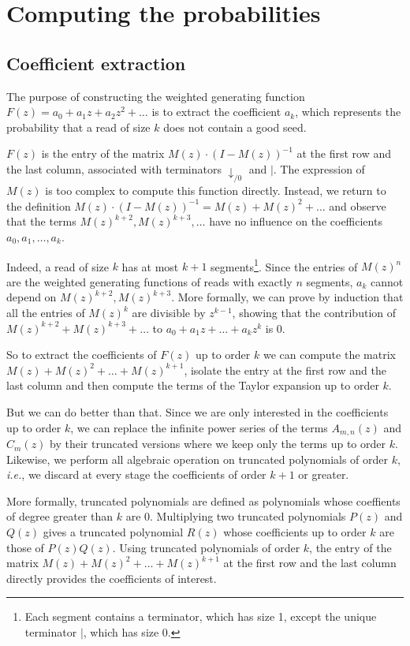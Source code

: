 \documentclass{article}
\begin{document}
\section{Computing the probabilities}
\label{sec:compute}

\subsection{Coefficient extraction}
\label{sec:extract}

The purpose of constructing the weighted generating function $F(z) = a_0 +
a_1z + a_2z^2 + \ldots$ is to extract the coefficient $a_k$, which
represents the probability that a read of size $k$ does not contain a
good seed.

$F(z)$ is the entry of the matrix $M(z) \cdot (I-M(z))^{-1}$ at the first
row and the last column, associated with terminators $\downarrow_{/0}$ and
$|$. The expression of $M(z)$ is too complex to compute this function
directly. Instead, we return to the definition $M(z) \cdot (I-M(z))^{-1} =
M(z) + M(z)^2 + \ldots$ and observe that the terms $M(z)^{k+2},
M(z)^{k+3}, \ldots$ have no influence on the coefficients $a_0, a_1,
\ldots, a_k$.

Indeed, a read of size $k$ has at most $k+1$ segments\footnote{Each
segment contains a terminator, which has size 1, except the unique
terminator $|$, which has size 0.}. Since the entries of $M(z)^n$ are the
weighted generating functions of reads with exactly $n$ segments, $a_k$
cannot depend on $M(z)^{k+2}, M(z)^{k+3}$. More formally, we can prove by
induction that all the entries of $M(z)^k$ are divisible by $z^{k-1}$,
showing that the contribution of $M(z)^{k+2} + M(z)^{k+3} + \ldots$ to
$a_0 + a_1z + \ldots +a_kz^k$ is $0$.

So to extract the coefficients of $F(z)$ up to order $k$ we can compute
the matrix $M(z) + M(z)^2 + \ldots + M(z)^{k+1}$, isolate the entry at the
first row and the last column and then compute the terms of the Taylor
expansion up to order $k$.

But we can do better than that. Since we are only interested in the
coefficients up to order $k$, we can replace the infinite power series
of the terms $A_{m,n}(z)$ and $C_m(z)$ by their truncated versions where
we keep only the terms up to order $k$. Likewise, we perform all
algebraic operation on truncated polynomials of order $k$, \textit{i.e.},
we discard at every stage the coefficients of order $k+1$ or greater.

More formally, truncated polynomials are defined as polynomials whose
coeffients of degree greater than $k$ are 0. Multiplying two truncated
polynomials $P(z)$ and $Q(z)$ gives a truncated polynomial $R(z)$ whose
coefficients up to order $k$ are those of $P(z)Q(z)$. Using truncated
polynomials of order $k$, the entry of the matrix $M(z) + M(z)^2 + \ldots
+ M(z)^{k+1}$ at the first row and the last column directly provides the
coefficients of interest.
\end{document}

